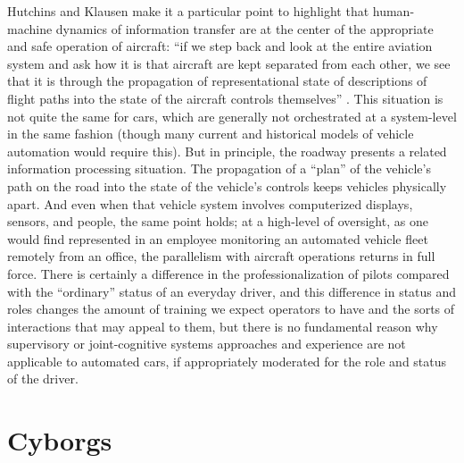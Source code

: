 
Hutchins and Klausen make it a particular point to highlight that
human-machine dynamics of information transfer are at the center of
the appropriate and safe operation of aircraft: ``if we step back and
look at the entire aviation system and ask how
it is that aircraft are kept separated from each other, we see that it
is through the propagation of representational state of descriptions
of flight paths into the state of the aircraft controls
themselves'' \cite[p. 14]{hutchinsKlausen}. This situation is not quite
the same for cars, which are generally not orchestrated at a
system-level in the same fashion (though many current and historical
models of vehicle automation would require this). But in principle,
the roadway presents a related 
information processing situation. The propagation of a ``plan'' of the
vehicle's path on the 
road into the state of the vehicle's controls keeps vehicles
physically apart.
And even when that vehicle system involves computerized
displays, sensors, and people, the same point holds;  at a high-level of oversight, as
one would find represented in an employee monitoring an automated
vehicle fleet remotely 
from an office, the parallelism with aircraft operations returns in
full force. There is certainly a difference in the
professionalization of pilots compared with the ``ordinary'' status of an
everyday driver, and this difference in status and roles
changes the amount of training we expect operators to have and the
sorts of interactions that may appeal to them, but there is no
fundamental reason why supervisory or joint-cognitive
systems approaches and
experience are not applicable to automated cars, if appropriately
moderated for the role and status of the driver. 

\section{Cyborgs}

